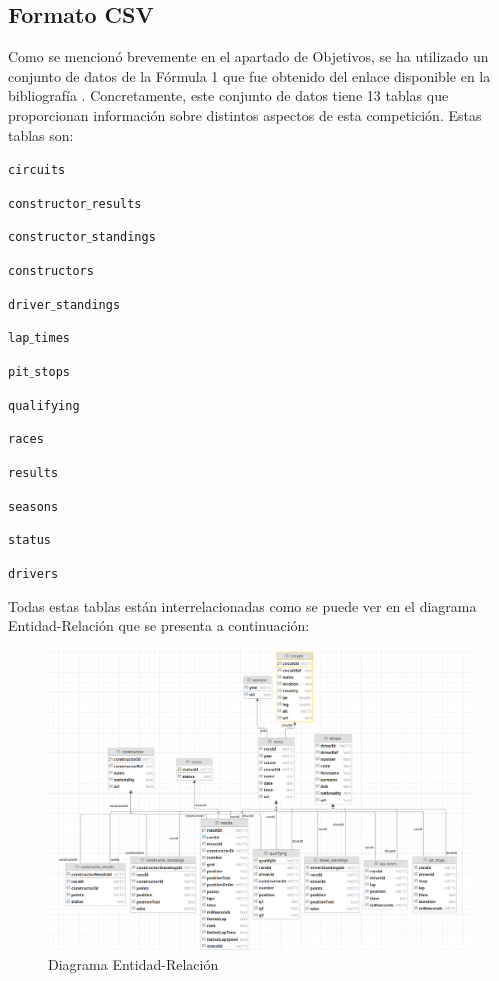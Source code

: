 \documentclass[12pt,twoside,titlepage]{report}
\begin{document}
\subsection{Formato CSV}

Como se mencionó brevemente en el apartado de Objetivos, se ha utilizado un conjunto de datos de la Fórmula 1 que fue obtenido del enlace disponible en la bibliografía \cite{datasource}. Concretamente, este conjunto de datos tiene 13 tablas que proporcionan información sobre distintos aspectos de esta competición. Estas tablas son:

\begin{compactitem}
  \item \texttt{circuits}
  \item \texttt{constructor$\_$results}
  \item \texttt{constructor$\_$standings}
  \item \texttt{constructors}
  \item \texttt{driver$\_$standings}
  \item \texttt{lap$\_$times}
  \item \texttt{pit$\_$stops}
  \item \texttt{qualifying}
  \item \texttt{races}
  \item \texttt{results}
  \item \texttt{seasons}
  \item \texttt{status}
  \item \texttt{drivers}
\end{compactitem}

Todas estas tablas están interrelacionadas como se puede ver en el diagrama Entidad-Relación que se presenta a continuación:

\begin{figure}[H]
  \includegraphics[scale=0.4]{dataset_visualization.png}
  \centering
  \caption{Diagrama Entidad-Relación}
  \label{fig:datavisualization}
  \centering
\end{figure}
\end{document}
